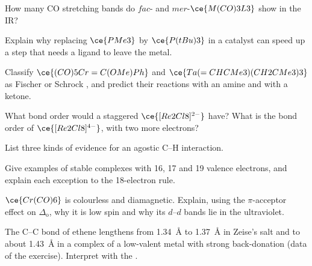 \begin{exercise}[$\star\star$]\label{exo:b3:organometallic-bonding:5}
How many CO stretching bands do $fac$- and $mer$-$\ce{M(CO)3L3}$ show in the IR?
\end{exercise}

\begin{exercise}[$\star\star$]\label{exo:b3:organometallic-bonding:6}
Explain why replacing $\ce{PMe3}$ by $\ce{P(tBu)3}$ in a catalyst can speed up a step that needs a
ligand to leave the metal.
\end{exercise}

\begin{exercise}[$\star\star$]\label{exo:b3:organometallic-bonding:7}
Classify $\ce{(CO)5Cr=C(OMe)Ph}$ and $\ce{Ta(=CHCMe3)(CH2CMe3)3}$ as Fischer or Schrock , and predict their reactions with an amine and with a ketone.
\end{exercise}

\begin{exercise}[$\star\star$]\label{exo:b3:organometallic-bonding:8}
What bond order would a staggered $\ce{[Re2Cl8]^{2-}}$ have? What is the bond order of
$\ce{[Re2Cl8]^{4-}}$, with two more electrons?
\end{exercise}

\begin{exercise}[$\star\star$]\label{exo:b3:organometallic-bonding:9}
List three kinds of evidence for an agostic C--H interaction.
\end{exercise}

\begin{exercise}[$\star\star\star$]\label{exo:b3:organometallic-bonding:10}
Give examples of stable complexes with 16, 17 and 19 valence electrons, and explain
each exception to the 18-electron rule.
\end{exercise}

\begin{exercise}[$\star\star\star$]\label{exo:b3:organometallic-bonding:11}
$\ce{Cr(CO)6}$ is colourless and diamagnetic. Explain, using the $\pi$-acceptor effect on $\Delta_{\mathrm o}$,
why it is low spin and why its $d$--$d$ bands lie in the ultraviolet.
\end{exercise}

\begin{exercise}[$\star\star\star$]\label{exo:b3:organometallic-bonding:12}
The C--C bond of ethene lengthens from \qty{1.34}{\AA} to \qty{1.37}{\AA} in Zeise's salt and to
about \qty{1.43}{\AA} in a complex of a low-valent metal with strong back-donation (data of the
exercise). Interpret with the .
\end{exercise}

